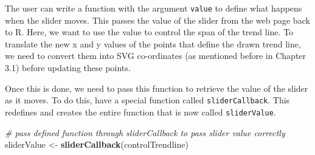 \documentclass[11pt,]{report}
\newenvironment{Shaded}{\begin{snugshade}}{\end{snugshade}}
\newcommand{\KeywordTok}[1]{\textcolor[rgb]{0.13,0.29,0.53}{\textbf{#1}}}
\newcommand{\DataTypeTok}[1]{\textcolor[rgb]{0.13,0.29,0.53}{#1}}
\newcommand{\DecValTok}[1]{\textcolor[rgb]{0.00,0.00,0.81}{#1}}
\newcommand{\StringTok}[1]{\textcolor[rgb]{0.31,0.60,0.02}{#1}}
\newcommand{\CommentTok}[1]{\textcolor[rgb]{0.56,0.35,0.01}{\textit{#1}}}
\newcommand{\ControlFlowTok}[1]{\textcolor[rgb]{0.13,0.29,0.53}{\textbf{#1}}}
\newcommand{\OperatorTok}[1]{\textcolor[rgb]{0.81,0.36,0.00}{\textbf{#1}}}
\newcommand{\NormalTok}[1]{#1}
\begin{document}
The user can write a function with the argument \texttt{value} to define
what happens when the slider moves. This passes the value of the slider
from the web page back to R. Here, we want to use the value to control
the span of the trend line. To translate the new x and y values of the
points that define the drawn trend line, we need to convert them into
SVG co-ordinates (as mentioned before in Chapter 3.1) before updating
these points.

\begin{Shaded}
\end{Shaded}

Once this is done, we need to pass this function to retrieve the value
of the slider as it moves. To do this, have a special function called
\texttt{sliderCallback}. This redefines and creates the entire function
that is now called \texttt{sliderValue}.

\begin{Shaded}
\begin{Highlighting}[]
\CommentTok{# pass defined function through sliderCallback to pass slider value correctly}
\NormalTok{sliderValue <-}\StringTok{ }\KeywordTok{sliderCallback}\NormalTok{(controlTrendline)}
\end{Highlighting}
\end{Shaded}
\end{document}
